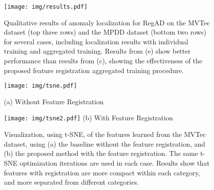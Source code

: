 \documentclass[runningheads]{llncs}
\begin{document}
\begin{table}[t]
\centering
\caption{Ablation studies of different transformation versions of STN modules on MVTec and MPDD for anomaly detection with . T, R means translation, and rotation, respectively. Results are listed as the macro-average AUC in \% over all categories in each dataset of 10 runs. The best-performing method is in bold.}
\label{tal:abl_stn}
\scriptsize
{}
\end{table}

\begin{figure}[t]
\centering
\texttt{[image: img/results.pdf]}
\caption{Qualitative results of anomaly localization for RegAD on the MVTec dataset (top three rows) and the MPDD dataset (bottom two rows) for several cases, including localization results with individual training and aggregated training. Results from (e) show better performance than results from (c), showing the effectiveness of the proposed feature registration aggregated training procedure.}
\label{img:result}
\end{figure}

\begin{figure}[t]
  \begin{minipage}[t]{0.5\textwidth}
\centering
\texttt{[image: img/tsne.pdf]}
\footnotesize

(a) Without Feature Registration
\end{minipage}
\begin{minipage}[t]{0.37\textwidth}
\centering
\texttt{[image: img/tsne2.pdf]}
\footnotesize
(b) With Feature Registration
\end{minipage}
\caption{Visualization, using t-SNE, of the features learned from the MVTec dataset, using (a) the baseline without the feature registration, and (b) the proposed method with the feature registration. The same t-SNE optimization iterations are used in each case. Results show that features with registration are more compact within each category, and more separated from different categories.}
\label{img:tsne}
\end{figure}
\end{document}
